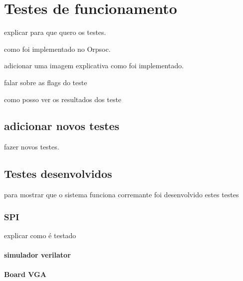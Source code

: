 
\chapter{Testes de funcionamento}
\label{chapter:teste}

explicar para que quero os testes.

como foi implementado no Orpsoc. 

adicionar uma imagem explicativa como foi implementado.

falar sobre as flags do teste

como posso ver os resultados dos teste

\section{adicionar novos testes}

fazer novos testes.

\section{Testes desenvolvidos}

para mostrar que o sistema funciona corremante foi desenvolvido estes testes 

\subsection{SPI}

explicar como é testado

\subsubsection{simulador verilator}

\subsubsection{Board VGA}

